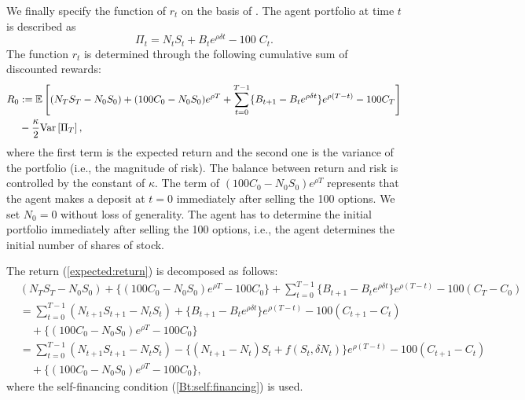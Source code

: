 \documentclass[11pt]{article}
\begin{document}
We finally specify the function of $r_t$ on the basis of \citep{Kolm:Ritter:2019}. The agent portfolio at time $t$ is described as
%
\begin{equation}
	\Pi_t = N_t S_t + B_t e^{\rho \delta t} - 100 \; C_t.
\end{equation}
%
The function $r_t$ is determined through the following cumulative sum of discounted rewards:
%
\begin{align}
	R_0 &:= \mathbb{E}\left[   (N_T S_T - N_0 S_0) + (100 C_0 - N_0 S_0) e^{\rho T}
	+ \sum_{t=0}^{T-1} \{B_{t+1} - B_t e^{\rho \delta t}\} e^{\rho (T-t)} - 100 C_T \right] \label{expected:return} \\
	&- \frac{\kappa}{2} {\rm Var} \left[ \Pi_T \right], \label{variance:sum:reward}
\end{align}
%
where the first term is the expected return and the second one is the variance of the portfolio (i.e., the magnitude of risk). The balance between return and risk is controlled by the constant of $\kappa$. The term of $(100 C_0 - N_0 S_0) e^{\rho T}$ represents that the agent makes a deposit at $t=0$ immediately after selling the 100 options. We set $N_0 = 0$ without loss of generality. The agent has to determine the initial portfolio immediately after selling the 100 options, i.e., the agent determines the initial number of shares of stock.

The return (\ref{expected:return}) is decomposed as follows:
%
\begin{align}
	&(N_T S_T - N_0 S_0) + \{ (100 C_0 - N_0 S_0) e^{\rho T} - 100 C_0 \} + \sum_{t=0}^{T-1} \{B_{t+1} - B_t e^{\rho \delta t}\} e^{\rho (T-t)} - 100 (C_T - C_0) \\
	&= \sum_{t=0}^{T-1} (N_{t+1} S_{t+1} - N_t S_t) + \{B_{t+1} - B_t e^{\rho \delta t}\} e^{\rho (T-t)} - 100 (C_{t+1} - C_t) \\
	&\quad+ \{ (100 C_0 - N_0 S_0) e^{\rho T} - 100 C_0 \} \\
	&= \sum_{t=0}^{T-1} (N_{t+1} S_{t+1} - N_t S_t) - \{ (N_{t+1}-N_t) S_t + f(S_t, \delta N_t) \} e^{\rho (T-t)} - 100 (C_{t+1} - C_t) \label{decomposition:return1} \\
	&\quad+ \{ (100 C_0 - N_0 S_0) e^{\rho T} - 100 C_0 \}, \label{decomposition:return2}
\end{align}
%
where the self-financing condition (\ref{Bt:self:financing}) is used.
\end{document}
